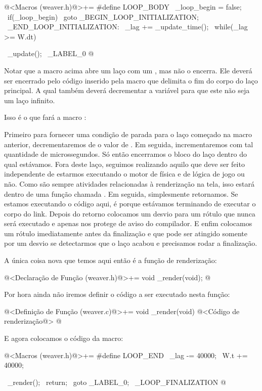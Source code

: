 \iniciocodigo
@<Macros (weaver.h)@>+=
#define LOOP_BODY                                            \
  _loop_begin =  false;                                      \
  if(_loop_begin)                                            \
    goto _BEGIN_LOOP_INITIALIZATION;                         \
_END_LOOP_INITIALIZATION:                                    \
  _lag += _update_time();                                    \
  while(_lag >= W.dt){                                       \
    _update();                                               \
_LABEL_0
@
\fimcodigo

Notar que a macro acima abre um laço com um \monoespaco{while}, mas
não o encerra. Ele deverá ser encerrado pelo código inserido pela
macro que delimita o fim do corpo do laço principal. A qual também
deverá decrementar a variável  para que este não
seja um laço infinito.


Isso é o que fará a macro \monoespaco{LOOP\_END}:

Primeiro para fornecer uma condição de parada para o laço começado na
macro anterior, decrementaremos de \monoespaco{\_lag} o valor
de \monoespaco{W.dt}. Em seguida, incrementaremos  com
tal quantidade de microssegundos. Só então encerramos o bloco do laço
dentro do qual estávamos. Fora deste laço, seguimos realizando aquilo
que deve ser feito independente de estarmos executando o motor de
física e de lógica de jogo ou não. Como são sempre atividades
relacionadas à renderização na tela, isso estará dentro de uma função
chamada \monoespaco{\_render}. Em seguida, simplesmente retornamos. Se
estamos executando o código aqui, é porque estávamos terminando de
executar o corpo do link. Depois do retorno colocamos um desvio para
um rótulo que nunca será executado e apenas nos protege de aviso do
compilador. E enfim colocamos um rótulo imediatamente antes da
finalização e que pode ser atingido somente por um desvio se
detectarmos que o laço acabou e precisamos rodar a finalização.

A única coisa nova que temos aqui então é a função de renderização:

\iniciocodigo
@<Declaração de Função (weaver.h)@>+=
void _render(void);
@
\fimcodigo

Por hora ainda não iremos definir o código a ser executado nesta
função:

\iniciocodigo
@<Definição de Função (weaver.c)@>+=
void _render(void){
  @<Código de renderização@>
}
@
\fimcodigo

E agora colocamos o código da macro:

\iniciocodigo
@<Macros (weaver.h)@>+=
#define LOOP_END                                           \
    _lag -=  40000;                                        \
    W.t +=  40000;                                         \
  }                                                        \
  _render();                                               \
  return;                                                  \
  goto _LABEL_0;                                           \
_LOOP_FINALIZATION
@
\fimcodigo

